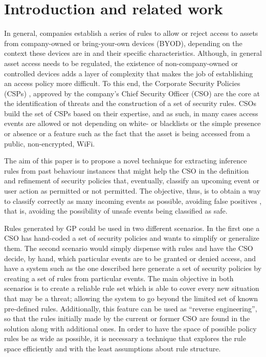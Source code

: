\documentclass[runningheads]{llncs}
\begin{document}
\section{Introduction and related work}
\label{sec:intro}


In general, companies establish a series of rules to allow or reject
access to assets from company-owned or bring-your-own devices (BYOD),
depending on the context these devices are in and their specific
characteristics. Although, in general asset access needs to be
regulated, the existence of non-company-owned or controlled devices
adds a layer of complexity that makes the job of establishing an
access policy more difficult.
To this end, the Corporate Security Policies (CSPs)
\cite{Kaeo:2003:DNS:1201807}, approved by the company's Chief Security
Officer (CSO) are the core at the identification of threats and the
construction of a set of security rules. CSOs build the
set of CSPs based on their expertise, and as such, in many cases
access events are allowed or not depending on white- or blacklists or
the simple presence or absence or a feature such as the fact that the
asset is being accessed from a public, non-encrypted, WiFi.

The aim of this paper is to propose a novel technique for extracting
inference rules from past behaviour instances 
that might help the CSO in the definition and refinement
of security policies that, eventually, classify an upcoming
event or user action as permitted or not permitted.
The objective, thus, is to obtain a way to classify correctly as many
incoming events as possible, avoiding false positives
\cite{pietraszek2005data}, that is, avoiding the possibility of unsafe
events being classified as safe.

Rules generated by GP could be used
in two different scenarios. In the first one a CSO has hand-coded a set of security
policies and wants to simplify or generalize them. The second scenario 
would simply dispense with rules and have the CSO decide, by hand, which
particular events are to be granted or denied access, and have a system such
as the one described here generate a set of security policies
by creating a set of rules from particular events. 
The main objective in both scenarios is to create a reliable rule set
which is able to cover every new situation that may be a threat;
allowing the system to go beyond the limited set of known pre-defined
rules. Additionally, this feature can be used as ``reverse
engineering'', so that the rules initially made by the current or
former CSO are found in the solution along with additional ones. In
order to have the space of possible policy rules be as wide 
as possible, it is necessary a technique that explores the rule space
efficiently and with the least assumptions about rule structure.
\end{document}
